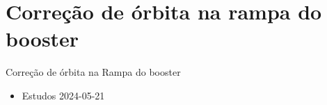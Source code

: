  \section{Correção de órbita na rampa do booster}



\begin{frame}{Correção de órbita na Rampa do booster}
\begin{itemize}
    \setlength\itemsep{1em}
    \item Estudos 2024-05-21
\end{itemize}
\end{frame}
